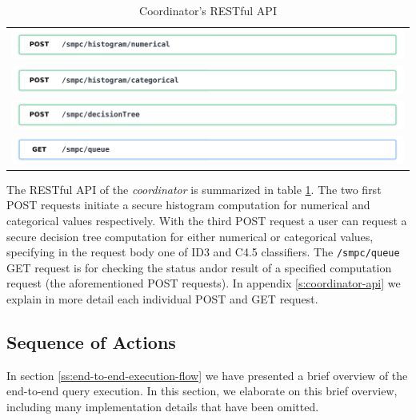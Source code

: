 \begin{table}[H]
  \centering
  \caption{Coordinator's RESTful API}
  \label{t:coordinator-api}
\begin{tabular}{l}
  \hyperref[s:post1]{\includegraphics[page=1,width=\textwidth]{figures/post1.pdf}} \\
  \hyperref[s:post2]{\includegraphics[page=1,width=\textwidth]{figures/post2.pdf}} \\
  \hyperref[s:post3]{\includegraphics[page=1,width=\textwidth]{figures/post3.pdf}} \\
  \hyperref[s:get1]{\includegraphics[page=1,width=\textwidth]{figures/get1.pdf}} \\
\end{tabular}
\end{table}


The RESTful API of the \textit{coordinator} is summarized in table \ref{t:coordinator-api}.
The two first POST requests initiate a secure histogram computation for numerical and categorical values respectively.
With the third POST request a user can request a secure decision tree computation for either numerical or categorical values, specifying in the request body one of ID3 and C4.5 classifiers.
The \texttt{/smpc/queue} GET request is for checking the status and\myslash or result of a specified computation request (the aforementioned POST requests).
In appendix \ref{s:coordinator-api} we explain in more detail each individual POST and GET request.


\subsection{Sequence of Actions}\label{ss:coordinator-sequence}

In section \ref{ss:end-to-end-execution-flow} we have presented a brief overview of the end\hyp to\hyp end query execution.
In this section, we elaborate on this brief overview, including many implementation details that have been omitted.

